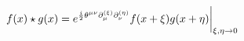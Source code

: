 \begin{equation}
f(x)\star
g(x)=e^{\frac{i}{2}\theta^{\mu\nu}\partial_{\mu}^{(\xi)}\partial_{\nu}^{(\eta)}}
f(x+\xi)g(x+\eta)\biggr|_{\xi,\eta\rightarrow 0}\\
\end{equation}

